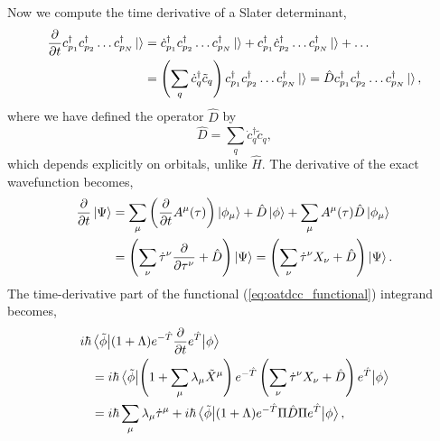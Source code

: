 Now we compute the time derivative of a Slater determinant,
\begin{equation*}
    \begin{aligned}
        \frac{\partial}{\partial t} c^\dagger_{p_1}c^\dagger_{p_2}\dots c^\dagger_{p_N}\ket{ }
        &= \dot{c}^\dagger_{p_1} c^\dagger_{p_2}\dots c^\dagger_{p_N} \ket{ }
        + c^\dagger_{p_1} \dot{c}^\dagger_{p_2}\dots c^\dagger_{p_N}\ket{ } + \dots \\
        &= \left(\sum_q \dot{c}^\dagger_q \tilde{c}_q \right)
        c^\dagger_{p_1}c^\dagger_{p_2}\dots c^\dagger_{p_N}\ket{ }
        = \hat{D}c^\dagger_{p_1}c^\dagger_{p_2}\dots c^\dagger_{p_N}\ket{ },
    \end{aligned}
\end{equation*}
where we have defined the operator $\hat{D}$ by 
\begin{equation}
    \hat{D} = \sum_q \dot{c}^\dagger_q \tilde{c}_q,
\end{equation}
which depends explicitly on orbitals, unlike $\hat{H}$. The derivative of the exact 
wavefunction becomes,
\begin{equation}
    \begin{aligned}
        \frac{\partial}{\partial t}\ket{\Psi} 
        &= \sum_\mu \left(\frac{\partial}{\partial t}A^\mu (\tau)\right)\ket{\phi_\mu}
         + \hat{D}\ket{\phi} + \sum_\mu A^\mu (\tau) \hat{D} \ket{\phi_\mu} \\
        &= \left(
            \sum_\nu \dot{\tau}^\nu \frac{\partial}{\partial \tau^\nu} + \hat{D}
        \right)\ket{\Psi}
        = \left(\sum_\nu \dot{\tau}^\nu X_\nu + \hat{D}\right)\ket{\Psi}.
    \end{aligned}
\end{equation}
The time-derivative part of the functional (\autoref{eq:oatdcc_functional}) integrand
becomes,
\begin{equation}
    \begin{aligned}
        i\hbar&\mel{\tilde{\phi}}
            {(1 + \Lambda)e^{-\hat{T}}\frac{\partial}{\partial t}e^{\hat{T}}}
        {\phi} \\
        &= i\hbar\mel{\tilde{\phi}}
            {
            \left(
                1 + \sum_\mu \lambda_\mu \tilde{X}^\mu     
            \right)
            e^{-\hat{T}}
            \left(
                \sum_\nu \dot{\tau}^\nu X_\nu + \hat{D}
            \right)
            e^{\hat{T}}
            }
        {\phi} \\
        &= i\hbar \sum_\mu \lambda_\mu \dot{\tau}^\mu
        + i\hbar \mel{\tilde{\phi}}
            {(1 + \Lambda)e^{-\hat{T}}\Pi\hat{D}\Pi e^{\hat{T}}}
        {\phi},
    \end{aligned}
\end{equation}
